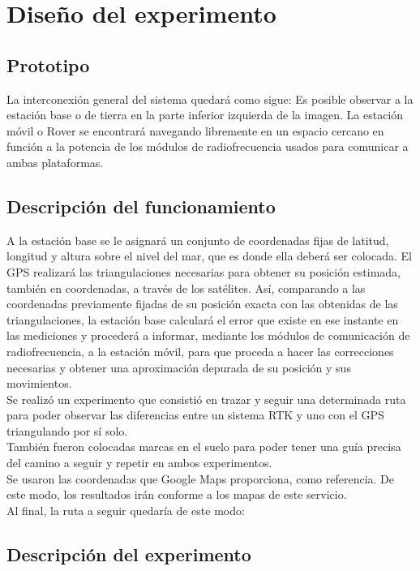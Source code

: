 
\chapter{Diseño del experimento} %

\label{DisExp} %


\section{Prototipo}

La interconexión general del sistema quedará como sigue: Es posible observar a la estación base o de tierra en la parte inferior izquierda de la imagen. La estación móvil o Rover se encontrará navegando libremente en un espacio cercano en función a la potencia de los módulos de radiofrecuencia usados para comunicar a ambas plataformas.

\section{Descripción del funcionamiento}

A la estación base se le asignará un conjunto de coordenadas fijas de latitud, longitud y altura sobre el nivel del mar, que es donde ella deberá ser colocada. El GPS realizará las triangulaciones necesarias para obtener su posición estimada, también en coordenadas, a través de los satélites. Así, comparando a las coordenadas previamente fijadas de su posición exacta con las obtenidas de las triangulaciones, la estación base calculará el
error que existe en ese instante en las mediciones y procederá a informar, mediante los módulos de comunicación de radiofrecuencia, a la estación móvil, para que proceda a hacer las correcciones necesarias y obtener una aproximación depurada de su posición y sus movimientos. \\

Se realizó un experimento que consistió en trazar y seguir una determinada ruta para poder observar las diferencias entre un sistema RTK y uno con el GPS triangulando por sí solo. \\

También fueron colocadas marcas en el suelo para poder tener una guía precisa del camino a seguir y repetir en ambos experimentos. \\

Se usaron las coordenadas que Google Maps proporciona, como referencia. De este modo, los resultados irán conforme a los mapas de este servicio. \\

Al final, la ruta a seguir quedaría de este modo:

\section{Descripción del experimento}